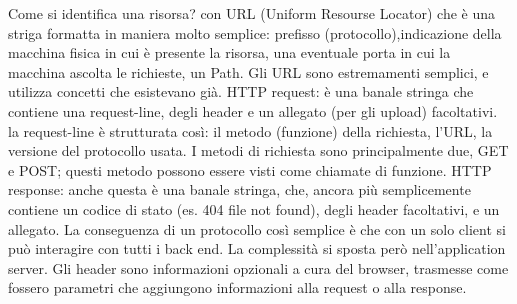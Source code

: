 Come si identifica una risorsa? con URL (Uniform Resourse Locator) che è una striga formatta in maniera molto semplice: prefisso (protocollo),indicazione della macchina fisica in cui è presente la risorsa, una eventuale porta in cui la macchina ascolta le richieste, un Path. Gli URL sono estremamenti semplici, e utilizza concetti che esistevano già.\newline
HTTP request: è una banale stringa che contiene una request-line, degli header e un allegato (per gli upload) facoltativi. la request-line è strutturata così: il metodo (funzione) della richiesta, l'URL, la versione del protocollo usata. I metodi di richiesta sono principalmente due, GET e POST; questi metodo possono essere visti come chiamate di funzione.\newline
HTTP response: anche questa è una banale stringa, che, ancora più semplicemente contiene un codice di stato (es. 404 file not found), degli header facoltativi, e un allegato.\newline
La conseguenza di un protocollo così semplice è che con un solo client si può interagire con tutti i back end. La complessità si sposta però nell'application server.\newline
Gli header sono informazioni opzionali a cura del browser, trasmesse come fossero parametri che aggiungono informazioni alla request o alla response.\newline
